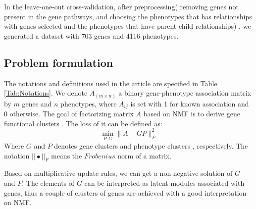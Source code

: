 \documentclass{bmcart}
\begin{document}
In the leave-one-out cross-validation, after preprocessing( removing genes not present in the gene pathways, and choosing the phenotypes that has relationships with genes selected and the phenotypes that have parent-child relationships)
, we generated a dataset with 703 genes and 4116 phenotypes.

\subsection*{\textbf{Problem formulation}}
The notations and definitions used in the article are specified in Table \ref{Tab:Notations}.
We denote $A_{(m \times n)}$ a binary gene-phenotype association matrix by $m$ genes and $n$ phenotypes, where $A_{ij}$ is set with 1 for known association and 0 otherwise. The goal of factorizing matrix $A$ based on NMF\cite{DanielD.Lee2001} is to derive gene functional clusters . The loss of it can be defined as:
\begin{equation}\label{equ:NMF}
\mathop{min}_{{P,G}} \|A-GP\|^{2}_{F}
\end{equation}
Where $G$ and $P$ denotes gene clusters and phenotype clusters , respectively. The notation $||\bullet||_F$ means the $Frobenius$ norm of a matrix.

Based on multiplicative update rules\cite{DanielD.Lee2001}, we can get a non-negative solution of $G$ and $P$. The elements of $G$ can be interpreted as latent modules associated with genes, thus a couple of clusters of genes are achieved with a good interpretation on NMF.
\end{document}
